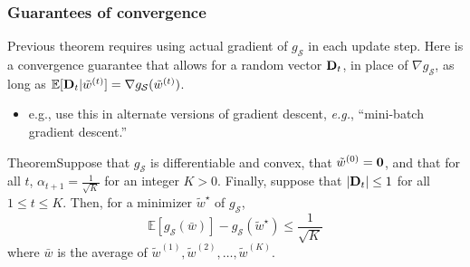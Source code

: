\documentclass{beamer}
\begin{document}
\begin{frame}
    \frametitle{Guarantees of convergence}
    Previous theorem requires using actual gradient of $g_{\mathcal S}$ in each update step. Here is a convergence guarantee that allows for a random vector ${\bf D}_t$, in place of $\nabla g_{\mathcal S}$, as long as $\mathbb E[{\bf D}_t | \tilde w^{(t)}] = \nabla g_{\mathcal S}(\tilde w^{(t)})$. 
    \begin{itemize}
        \item e.g., use this in alternate versions of gradient descent, \textit{e.g.}, ``mini-batch gradient descent.''
    \end{itemize}

    \pause
    \begin{alertblock}{Theorem}Suppose that $g_{\mathcal S}$ is differentiable and convex, that $\tilde w^{(0)} = {\bf 0}$, and that for all $t$, $\alpha_{t+1} = \frac{1}{\sqrt{K}}$ for an integer $K > 0$. Finally, suppose that $|{\bf D}_t| \le 1$ for all $1\le t\le K$. Then, for a minimizer $\tilde w^\star$ of $g_{\mathcal S}$,
            \[\mathbb E[g_{\mathcal S}(\bar w)] - g_{\mathcal S}(\tilde w^\star) \le \frac{1}{\sqrt{K}}\]
    where $\bar w$ is the average of $\tilde w^{(1)}, \tilde w^{(2)}, \ldots, \tilde w^{(K)}$.
    \end{alertblock}
\end{frame}
\end{document}
